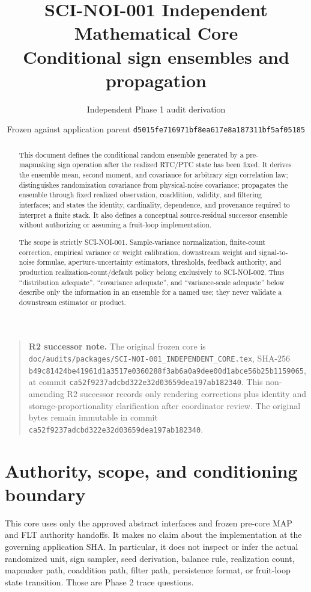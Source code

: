 \documentclass[11pt]{article}
\title{SCI-NOI-001 Independent Mathematical Core\\
Conditional sign ensembles and propagation}
\author{Independent Phase 1 audit derivation}
\date{Frozen against application parent
\texttt{d5015fe716971bf8ea617e8a187311bf5af05185}}
\begin{document}
\maketitle

\begin{quote}
\small
\textbf{R2 successor note.}
The original frozen core is
\texttt{doc/audits/packages/SCI-NOI-001\_INDEPENDENT\_CORE.tex},
SHA-256
\texttt{b49c81424be41961d1a3517e0360288f3ab6a0a9dee00d1abce56b25b1159065},
at commit
\texttt{ca52f9237adcbd322e32d03659dea197ab182340}.
This non-amending R2 successor records only rendering corrections plus
identity and storage-proportionality clarification after coordinator review.
The original bytes remain immutable in commit
\texttt{ca52f9237adcbd322e32d03659dea197ab182340}.
\end{quote}

\begin{abstract}
This document defines the conditional random ensemble generated by a
pre-mapmaking sign operation after the realized RTC/PTC state has been fixed.
It derives the ensemble mean, second moment, and covariance for arbitrary sign
correlation law; distinguishes randomization covariance from physical-noise
covariance; propagates the ensemble through fixed realized observation,
coaddition, validity, and filtering interfaces; and states the identity,
cardinality, dependence, and provenance required to interpret a finite stack.
It also defines a conceptual source-residual successor ensemble without
authorizing or assuming a fruit-loop implementation.

The scope is strictly SCI-NOI-001.  Sample-variance normalization, finite-count
correction, empirical variance or weight calibration, downstream weight and
signal-to-noise formulae, aperture-uncertainty estimators, thresholds,
feedback authority, and production realization-count/default policy belong
exclusively to SCI-NOI-002.  Thus ``distribution adequate'', ``covariance
adequate'', and ``variance-scale adequate'' below describe only the information
in an ensemble for a named use; they never validate a downstream estimator or
product.
\end{abstract}

\section{Authority, scope, and conditioning boundary}

This core uses only the approved abstract interfaces and frozen pre-core MAP
and FLT authority handoffs.  It makes no claim about the implementation at the
governing application SHA.  In particular, it does not inspect or infer the
actual randomized unit, sign sampler, seed derivation, balance rule,
realization count, mapmaker path, coaddition path, filter path, persistence
format, or fruit-loop state transition.  Those are Phase 2 trace questions.
\end{document}
